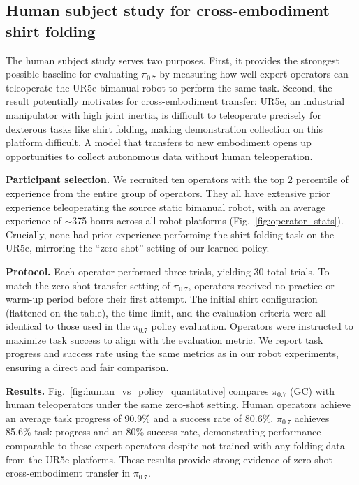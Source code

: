 \documentclass[conference]{IEEEtran}
\def \MethodName {$\pi_{0.7}$}
\begin{document}
\subsection{Human subject study for cross-embodiment shirt folding}  \label{app:human_study}

The human subject study serves two purposes. First, it provides the strongest possible baseline for evaluating \MethodName{} by measuring how well expert operators can teleoperate the UR5e bimanual robot to perform the same task. Second, the result potentially motivates for cross-embodiment transfer: UR5e, an industrial manipulator with high joint inertia, is difficult to teleoperate precisely for dexterous tasks like shirt folding, making demonstration collection on this platform difficult. A model that transfers to new embodiment opens up opportunities to collect autonomous data without human teleoperation.

\textbf{Participant selection.} We recruited ten operators with the top 2 percentile of experience from the entire group of operators. They all have extensive prior experience teleoperating the source static bimanual robot, with an average experience of $\sim$375 hours across all robot platforms (Fig.~\ref{fig:operator_stats}). Crucially, none had prior experience performing the shirt folding task on the UR5e, mirroring the ``zero-shot'' setting of our learned policy.

\textbf{Protocol.} Each operator performed three trials, yielding 30 total trials. To match the zero-shot transfer setting of \MethodName{}, operators received no practice or warm-up period before their first attempt. The initial shirt configuration (flattened on the table), the time limit, and the evaluation criteria were all identical to those used in the \MethodName{} policy evaluation. Operators were instructed to maximize task success to align with the evaluation metric. We report task progress and success rate using the same metrics as in our robot experiments, ensuring a direct and fair comparison.

\textbf{Results.}
Fig.~\ref{fig:human_vs_policy_quantitative} compares \MethodName{} (GC) with human teleoperators under the same zero-shot setting. Human operators achieve an average task progress of 90.9\% and a success rate of 80.6\%. \MethodName{} achieves 85.6\% task progress and an 80\% success rate, demonstrating performance comparable to these expert operators despite not trained with any folding data from the UR5e platforms. These results provide strong evidence of zero-shot cross-embodiment transfer in \MethodName{}.
\end{document}

